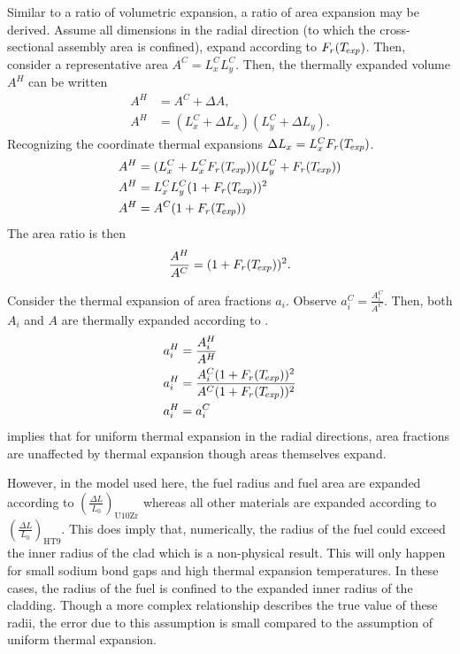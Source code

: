     Similar to a ratio of volumetric expansion, a ratio of area expansion may be
    derived. Assume all dimensions in the radial direction (to which the
    cross-sectional assembly area is confined), expand according to
    $F_r(T_{\!\mbox{\scriptsize \em exp}})$. Then, consider a representative area $A^C = L_x^C L_y^C$.
    Then, the thermally expanded volume $A^H$ can be written
    \begin{align}
      A^H &= A^C + \Delta A, \\
      A^H &= (L_x^C + \Delta L_x) (L_y^C + \Delta L_y).
    \end{align}
    Recognizing the coordinate thermal expansions ${\Delta L_x = L_x^C
    F_r(T_{\!\mbox{\scriptsize \em exp}})}$.
    \begin{align}
      A^H &= (L_x^C + L_x^C F_r(T_{\!\mbox{\scriptsize \em exp}})) (L_y^C + F_r(T_{\!\mbox{\scriptsize \em exp}})) \\
      A^H &= L_x^C L_y^C (1 + F_r(T_{\!\mbox{\scriptsize \em exp}}))^2 \\
      A^H &= A^C (1 + F_r(T_{\!\mbox{\scriptsize \em exp}}))
    \end{align}
    The area ratio is then
    \begin{equation}
      \label{eq:area_ratio}
      \frac{A^H}{A^C} = (1 + F_r(T_{\!\mbox{\scriptsize \em exp}}))^2.
    \end{equation}

    Consider the thermal expansion of area fractions $a_i$. Observe $a_i^C =
    \frac{A_i^C}{A^C}$. Then, both $A_i$ and $A$ are thermally expanded 
    according to .
    \begin{align}
      a_i^H &= \frac{A_i^H}{A^H} \\
      a_i^H &= \frac{A_i^C (1 + F_r(T_{\!\mbox{\scriptsize \em exp}}))^2}{A^C (1 + F_r(T_{\!\mbox{\scriptsize \em exp}}))^2} \\
      \label{eq:constant_area_frac}
      a_i^H &= a_i^C
    \end{align}
     implies that for uniform thermal expansion in 
    the radial directions, area fractions are unaffected by thermal expansion 
    though areas themselves expand. 
    
    However, in the model used here, the fuel radius and fuel area
    are expanded according to $\left(\frac{\Delta L}{L_0}\right)_{\text{U10Zr}}$
    whereas all other materials are expanded according to 
    $\left(\frac{\Delta L}{L_0}\right)_{\text{HT9}}$. This does imply that,
    numerically, the radius of the fuel could exceed the inner radius of the 
    clad which is a non-physical result. This will only happen for small sodium 
    bond gaps and high thermal expansion temperatures. In these cases, the 
    radius of the fuel is confined to the expanded inner radius of the cladding.
    Though a more complex relationship describes the true value of these radii, 
    the error due to this assumption is small compared to the assumption of 
    uniform thermal expansion.
    
